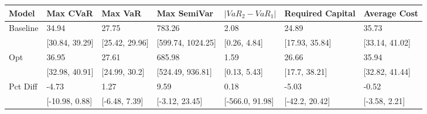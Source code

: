 \begin{tabular}{lllllll}
\toprule
   Model &       Max CVaR &        Max VaR &       Max SemiVar & $|VaR_2 - VaR_1|$ & Required Capital &   Average Cost \\
\midrule
Baseline &          34.94 &          27.75 &            783.26 &              2.08 &            24.89 &          35.73 \\
         & [30.84, 39.29] & [25.42, 29.96] & [599.74, 1024.25] &      [0.26, 4.84] &   [17.93, 35.84] & [33.14, 41.02] \\
     Opt &          36.95 &          27.61 &            685.98 &              1.59 &            26.66 &          35.94 \\
         & [32.98, 40.91] &  [24.99, 30.2] &  [524.49, 936.81] &      [0.13, 5.43] &    [17.7, 38.21] & [32.82, 41.44] \\
Pct Diff &          -4.73 &           1.27 &              9.59 &              0.18 &            -5.03 &          -0.52 \\
         & [-10.98, 0.88] &  [-6.48, 7.39] &    [-3.12, 23.45] &   [-566.0, 91.98] &   [-42.2, 20.42] &  [-3.58, 2.21] \\
\bottomrule
\end{tabular}
